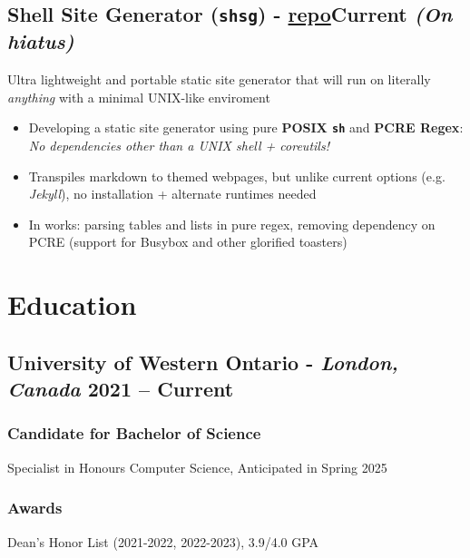 \documentclass[9pt]{article}
\begin{document}
\subsection{Shell Site Generator (\texttt{shsg}) \normalsize\textnormal{- \href{https://github.com/ianayl/shsg}{repo}}\hfill \normalsize\textnormal{Current \textit{(On hiatus)}}}
  Ultra lightweight and portable static site generator that will run on literally \textit{anything} with a minimal UNIX-like enviroment
\vspace{-0.5em}
\begin{itemize}
  \item Developing a static site generator using pure \textbf{POSIX \texttt{sh}} and \textbf{PCRE Regex}: \textit{No dependencies other than a UNIX shell + coreutils!}
  \item Transpiles markdown to themed webpages, but unlike current options (e.g. \textit{Jekyll}), no installation + alternate runtimes needed
    \item In works: parsing tables and lists in pure regex, removing dependency on PCRE (support for Busybox and other glorified toasters)
\end{itemize}

\section{Education}
\subsection{University of Western Ontario - \normalsize\textit{London, Canada} \hfill \normalsize\textnormal{2021 -- Current}}
\subsubsection{Candidate for Bachelor of Science} Specialist in Honours Computer Science, Anticipated in Spring 2025

\subsubsection{Awards} Dean's Honor List (2021-2022, 2022-2023), 3.9/4.0 GPA %
\end{document}
